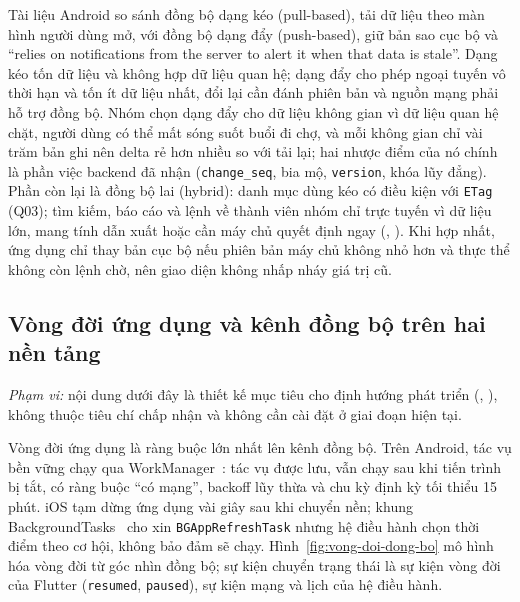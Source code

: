 Tài liệu Android so sánh đồng bộ dạng kéo (pull-based), tải dữ liệu theo màn hình người dùng mở, với đồng bộ dạng đẩy (push-based), giữ bản sao cục bộ và “relies on notifications from the server to alert it when that data is stale”. Dạng kéo tốn dữ liệu và không hợp dữ liệu quan hệ; dạng đẩy cho phép ngoại tuyến vô thời hạn và tốn ít dữ liệu nhất, đổi lại cần đánh phiên bản và nguồn mạng phải hỗ trợ đồng bộ. Nhóm chọn dạng đẩy cho dữ liệu không gian vì dữ liệu quan hệ chặt, người dùng có thể mất sóng suốt buổi đi chợ, và mỗi không gian chỉ vài trăm bản ghi nên delta rẻ hơn nhiều so với tải lại; hai nhược điểm của nó chính là phần việc backend đã nhận (\texttt{change\_seq}, bia mộ, \texttt{version}, khóa lũy đẳng). Phần còn lại là đồng bộ lai (hybrid): danh mục dùng kéo có điều kiện với \texttt{ETag} (Q03); tìm kiếm, báo cáo và lệnh về thành viên nhóm chỉ trực tuyến vì dữ liệu lớn, mang tính dẫn xuất hoặc cần máy chủ quyết định ngay (, ). Khi hợp nhất, ứng dụng chỉ thay bản cục bộ nếu phiên bản máy chủ không nhỏ hơn và thực thể không còn lệnh chờ, nên giao diện không nhấp nháy giá trị cũ.

\subsection{Vòng đời ứng dụng và kênh đồng bộ trên hai nền tảng}\label{ssec:vong-doi-dong-bo}

\emph{Phạm vi:} nội dung dưới đây là thiết kế mục tiêu cho định hướng phát triển (, ), không thuộc tiêu chí chấp nhận và không cần cài đặt ở giai đoạn hiện tại.

Vòng đời ứng dụng là ràng buộc lớn nhất lên kênh đồng bộ. Trên Android, tác vụ bền vững chạy qua WorkManager~\cite{androidwork}: tác vụ được lưu, vẫn chạy sau khi tiến trình bị tắt, có ràng buộc “có mạng”, backoff lũy thừa và chu kỳ định kỳ tối thiểu 15 phút. iOS tạm dừng ứng dụng vài giây sau khi chuyển nền; khung BackgroundTasks~\cite{applebgtasks} cho xin \texttt{BGApp\allowbreak RefreshTask} nhưng hệ điều hành chọn thời điểm theo cơ hội, không bảo đảm sẽ chạy. Hình~\ref{fig:vong-doi-dong-bo} mô hình hóa vòng đời từ góc nhìn đồng bộ; sự kiện chuyển trạng thái là sự kiện vòng đời của Flutter (\texttt{resumed}, \texttt{paused}), sự kiện mạng và lịch của hệ điều hành.


